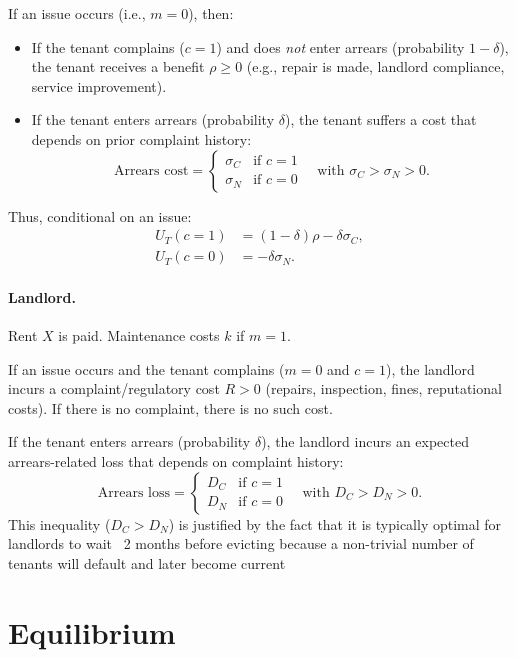 \documentclass[11pt]{article}
\begin{document}
If an issue occurs (i.e., $m=0$), then:
\begin{itemize}
  \item If the tenant complains ($c=1$) and does \emph{not} enter arrears (probability $1-\delta$), the tenant receives a benefit $\rho \ge 0$ (e.g., repair is made, landlord compliance, service improvement).
  \item If the tenant enters arrears (probability $\delta$), the tenant suffers a cost that depends on prior complaint history:
  \[
    \text{Arrears cost} =
    \begin{cases}
      \sigma_C & \text{if } c=1 \\
      \sigma_N & \text{if } c=0
    \end{cases}
    \quad \text{with } \sigma_C > \sigma_N > 0.
  \]
\end{itemize}
Thus, conditional on an issue:
\begin{align}
  U_T(c=1) &= (1-\delta)\rho - \delta \sigma_C, \label{eq:UTc1} \\
  U_T(c=0) &= -\delta \sigma_N. \label{eq:UTc0}
\end{align}

\paragraph{Landlord.}
Rent $X$ is paid. Maintenance costs $k$ if $m=1$.

If an issue occurs and the tenant complains ($m=0$ and $c=1$), the landlord incurs a complaint/regulatory cost $R>0$ (repairs, inspection, fines, reputational costs). If there is no complaint, there is no such cost.

If the tenant enters arrears (probability $\delta$), the landlord incurs an expected arrears-related loss that depends on complaint history:
\[
  \text{Arrears loss} =
  \begin{cases}
    D_C & \text{if } c=1 \\
    D_N & \text{if } c=0
  \end{cases}
  \quad \text{with } D_C > D_N > 0.
\]
This inequality ($D_C>D_N$) is justified by the fact that it is typically optimal for landlords to wait ~2 months before evicting because a non-trivial number of tenants will default and later become current

\section{Equilibrium}
\end{document}
